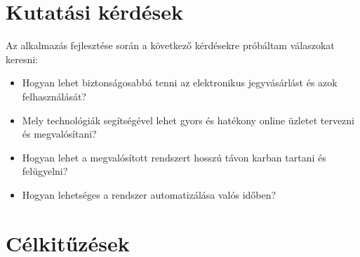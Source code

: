 \section {Kutatási kérdések}

Az alkalmazás fejlesztése során a következő kérdésekre próbáltam válaszokat keresni:
\begin{itemize}
	\item Hogyan lehet biztonságosabbá tenni az elektronikus jegyvásárlást és azok felhasználását?
	\item Mely technológiák segítségével lehet gyors és hatékony online üzletet tervezni és megvalósítani?
	\item Hogyan lehet a megvalósított rendszert hosszú távon karban tartani és felügyelni?
	\item Hogyan lehetséges a rendszer automatizálása valós időben?
\end{itemize}

\section {Célkitűzések}

